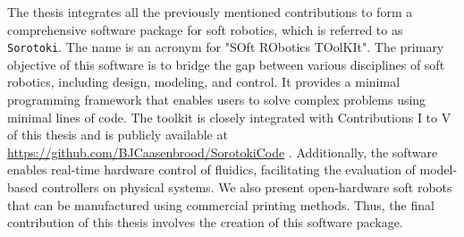 The thesis integrates all the previously mentioned contributions to form a comprehensive software package for soft robotics, which is referred to as \texttt{Sorotoki}. The name is an acronym for "SOft RObotics TOolKIt". The primary objective of this software is to bridge the gap between various disciplines of soft robotics, including design, modeling, and control. It provides a minimal programming framework that enables users to solve complex problems using minimal lines of code. The toolkit is closely integrated with Contributions I to V of this thesis and is publicly available at \url{https://github.com/BJCaasenbrood/SorotokiCode} \cite{SorotokiCode}. Additionally, the software enables real-time hardware control of fluidics, facilitating the evaluation of model-based controllers on physical systems. We also present open-hardware soft robots that can be manufactured using commercial printing methods. Thus, the final contribution of this thesis involves the creation of this software package.

